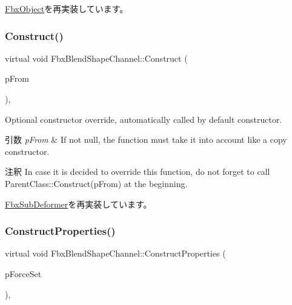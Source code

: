 \hyperlink{class_fbx_object_ad553a4262b09cb57c3171a93edadbab8}{Fbx\+Object}を再実装しています。

\mbox{\label{class_fbx_blend_shape_channel_ad16237e4706289af6a9235b8425415cb}} 
\subsubsection{\texorpdfstring{Construct()}{Construct()}}
{\footnotesize\ttfamily virtual void Fbx\+Blend\+Shape\+Channel\+::\+Construct (\begin{DoxyParamCaption}\item[{const \hyperlink{class_fbx_object}{Fbx\+Object} $\ast$}]{p\+From }\end{DoxyParamCaption})\hspace{0.3cm}{\ttfamily [protected]}, {\ttfamily [virtual]}}

Optional constructor override, automatically called by default constructor. 
\begin{DoxyParams}{引数}
{\em p\+From} & If not null, the function must take it into account like a copy constructor. \\
\hline
\end{DoxyParams}
\begin{DoxyRemark}{注釈}
In case it is decided to override this function, do not forget to call Parent\+Class\+::\+Construct(p\+From) at the beginning. 
\end{DoxyRemark}


\hyperlink{class_fbx_sub_deformer_ae3d566383651e82b681827f0f38b97f3}{Fbx\+Sub\+Deformer}を再実装しています。

\mbox{\label{class_fbx_blend_shape_channel_a6ab3c2d6435d70a7c1b182097802ba90}} 
\subsubsection{\texorpdfstring{Construct\+Properties()}{ConstructProperties()}}
{\footnotesize\ttfamily virtual void Fbx\+Blend\+Shape\+Channel\+::\+Construct\+Properties (\begin{DoxyParamCaption}\item[{bool}]{p\+Force\+Set }\end{DoxyParamCaption})\hspace{0.3cm}{\ttfamily [protected]}, {\ttfamily [virtual]}}

